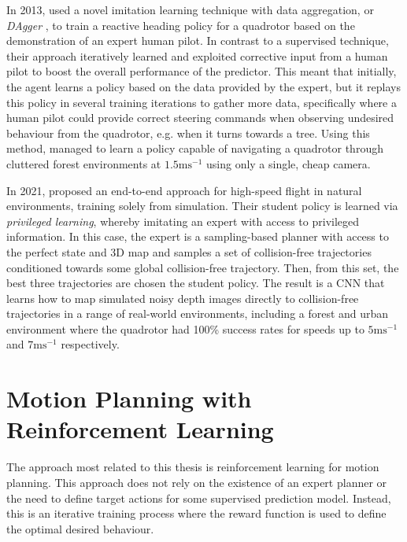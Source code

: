 In 2013, \cite{monocularReactiveUAVControl} used a novel imitation learning technique with data aggregation, or \textit{DAgger} \cite{DAgger}, to train a reactive heading policy for a quadrotor based on the demonstration of an expert human pilot. In contrast to a supervised technique, their approach iteratively learned and exploited corrective input from a human pilot to boost the overall performance of the predictor. This meant that initially, the agent learns a policy based on the data provided by the expert, but it replays this policy in several training iterations to gather more data, specifically where a human pilot could provide correct steering commands when observing undesired behaviour from the quadrotor, e.g. when it turns towards a tree. 
Using this method, \cite{monocularReactiveUAVControl} managed to learn a policy capable of navigating a quadrotor through cluttered forest environments at $1.5\text{ms}^{-1}$ using only a single, cheap camera.

In 2021, \cite{HighSpeedFlightWild} proposed an end-to-end approach for high-speed flight in natural environments, training solely from simulation. Their student policy is learned via \textit{privileged learning}, whereby imitating an expert with access to privileged information. In this case, the expert is a sampling-based planner with access to the perfect state and 3D map and samples a set of collision-free trajectories conditioned towards some global collision-free trajectory. Then, from this set, the best three trajectories are chosen the student policy.
The result is a CNN that learns how to map simulated noisy depth images directly to collision-free trajectories in a range of real-world environments, including a forest and urban environment where the quadrotor had 100\% success rates for speeds up to $5\text{ms}^{-1}$ and $7\text{ms}^{-1}$ respectively.


\section{Motion Planning with Reinforcement Learning}
\label{sec:3_reinforcement_learning}
The approach most related to this thesis is reinforcement learning for motion planning. This approach does not rely on the existence of an expert planner or the need to define target actions for some supervised prediction model. Instead, this is an iterative training process where the reward function is used to define the optimal desired behaviour.

